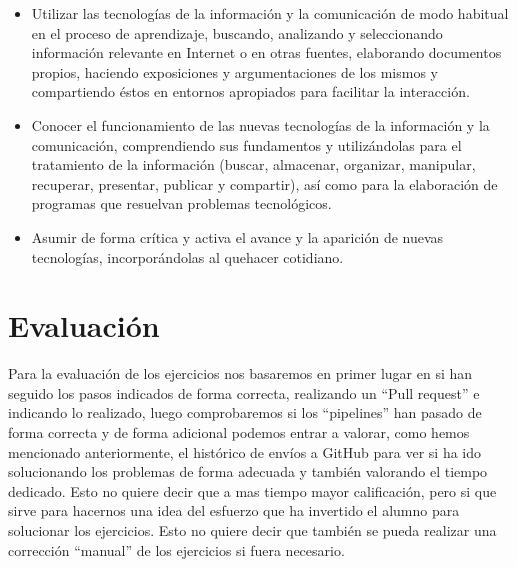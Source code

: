\begin{itemize}

    \item Utilizar las tecnologías de la información y la comunicación de modo habitual en el proceso de aprendizaje, buscando, analizando y seleccionando información relevante en Internet o en otras fuentes,  elaborando documentos propios, haciendo exposiciones y argumentaciones de los mismos y compartiendo éstos en entornos apropiados para facilitar la interacción.

    \item Conocer el funcionamiento de las nuevas tecnologías de la información y la comunicación, comprendiendo sus fundamentos y utilizándolas para el tratamiento de la información (buscar, almacenar, organizar, manipular, recuperar, presentar, publicar y compartir), así como para la elaboración de programas que resuelvan problemas tecnológicos.

    \item Asumir de forma crítica y activa el avance y la aparición de nuevas tecnologías, incorporándolas al quehacer cotidiano.

\end{itemize}

\section{Evaluación}

Para la evaluación de los ejercicios nos basaremos en primer lugar en si han seguido los pasos indicados de forma correcta, realizando un ``Pull request'' e indicando lo realizado, luego comprobaremos si los ``pipelines'' han pasado de forma correcta y de forma adicional podemos entrar a valorar, como hemos mencionado anteriormente, el histórico de envíos a GitHub para ver si ha ido solucionando los problemas de forma adecuada y también valorando el tiempo dedicado. Esto no quiere decir que a mas tiempo mayor calificación, pero si que sirve para hacernos una idea del esfuerzo que ha invertido el alumno para solucionar los ejercicios. Esto no quiere decir que también se pueda realizar una corrección ``manual'' de los ejercicios si fuera necesario.




